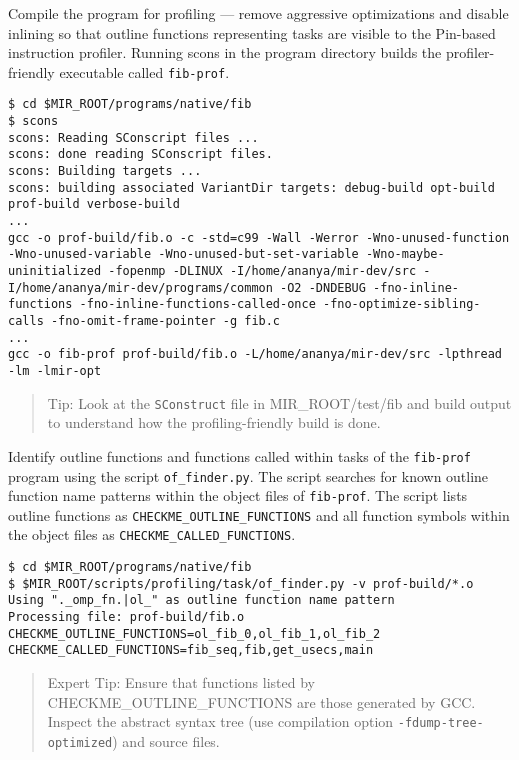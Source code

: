 \documentclass[11pt,a4paper]{article}
\begin{document}
Compile the program for profiling ---  remove aggressive optimizations and disable inlining so that outline functions representing tasks are visible to the Pin-based instruction profiler. Running scons in the program directory builds the profiler-friendly executable called \texttt{fib-prof}.

\begin{lstlisting}[style=MyInputStyle]
$ cd $MIR_ROOT/programs/native/fib
$ scons
scons: Reading SConscript files ...
scons: done reading SConscript files.
scons: Building targets ...
scons: building associated VariantDir targets: debug-build opt-build prof-build verbose-build
...
gcc -o prof-build/fib.o -c -std=c99 -Wall -Werror -Wno-unused-function -Wno-unused-variable -Wno-unused-but-set-variable -Wno-maybe-uninitialized -fopenmp -DLINUX -I/home/ananya/mir-dev/src -I/home/ananya/mir-dev/programs/common -O2 -DNDEBUG -fno-inline-functions -fno-inline-functions-called-once -fno-optimize-sibling-calls -fno-omit-frame-pointer -g fib.c
...
gcc -o fib-prof prof-build/fib.o -L/home/ananya/mir-dev/src -lpthread -lm -lmir-opt
\end{lstlisting}

\begin{framed}
\begin{quote}
Tip: Look at the \texttt{SConstruct} file in MIR\_ROOT/test/fib and build output to understand how the profiling-friendly build is done.
\end{quote}
\end{framed}

Identify outline functions and functions called within tasks of the \texttt{fib-prof} program using the script \texttt{of\_finder.py}. The script searches for known outline function name patterns within the object files of \texttt{fib-prof}. The script lists outline functions as \texttt{CHECKME\_OUTLINE\_FUNCTIONS} and all function symbols within the object files as \texttt{CHECKME\_CALLED\_FUNCTIONS}.

\begin{lstlisting}[style=MyInputStyle]
$ cd $MIR_ROOT/programs/native/fib
$ $MIR_ROOT/scripts/profiling/task/of_finder.py -v prof-build/*.o
Using "._omp_fn.|ol_" as outline function name pattern
Processing file: prof-build/fib.o
CHECKME_OUTLINE_FUNCTIONS=ol_fib_0,ol_fib_1,ol_fib_2
CHECKME_CALLED_FUNCTIONS=fib_seq,fib,get_usecs,main
\end{lstlisting}

\begin{framed}
\begin{quote}
Expert Tip: Ensure that functions listed by CHECKME\_OUTLINE\_FUNCTIONS are those generated by GCC. Inspect the abstract syntax tree (use compilation option \texttt{-fdump-tree-optimized}) and source files.
\end{quote}
\end{framed}
\end{document}
